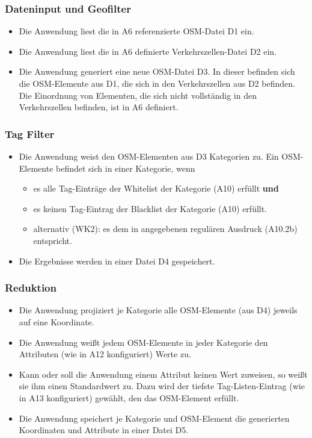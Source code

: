 \documentclass[parskip=full]{scrartcl} %
\begin{document}
\subsubsection*{Dateninput und Geofilter}
\begin{itemize}
    \item Die Anwendung liest die in A6 referenzierte OSM-Datei D1 ein.
    \item Die Anwendung liest die in A6 definierte Verkehrszellen-Datei D2 ein.
    \item Die Anwendung generiert eine neue OSM-Datei D3. In dieser befinden sich die OSM-Elemente aus D1, die sich in den Verkehrszellen aus D2 befinden. Die Einordnung von Elementen, die sich nicht vollständig in den Verkehrszellen befinden, ist in A6 definiert.
\end{itemize}


\subsubsection*{Tag Filter}
\begin{itemize}
    \item Die Anwendung weist den OSM-Elementen aus D3 Kategorien zu. Ein OSM-Elemente befindet sich in einer Kategorie, wenn
    \begin{itemize}
        \item es alle Tag-Einträge der Whitelist der Kategorie (A10) erfüllt \textbf{und}
        \item es keinen Tag-Eintrag der Blacklist der Kategorie (A10) erfüllt.
        \item alternativ (WK2): es dem in angegebenen regulären Ausdruck (A10.2b) entspricht.
    \end{itemize}
    \item Die Ergebnisse werden in einer Datei D4 gespeichert.
\end{itemize}


\subsubsection*{Reduktion}
\begin{itemize}
    \item Die Anwendung projiziert je Kategorie alle OSM-Elemente (aus D4) jeweils auf eine Koordinate.
    \item Die Anwendung weißt jedem OSM-Elemente in jeder Kategorie den Attributen (wie in A12 konfiguriert) Werte zu.
    \item Kann oder soll die Anwendung einem Attribut keinen Wert zuweisen, so weißt sie ihm einen Standardwert zu. Dazu wird der tiefste Tag-Listen-Eintrag (wie in A13 konfiguriert) gewählt, den das OSM-Element erfüllt.
    \item Die Anwendung speichert je Kategorie und OSM-Element die generierten Koordinaten und Attribute in einer Datei D5.
\end{itemize}
\end{document}
